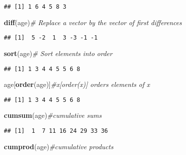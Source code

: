 \documentclass[]{book}
\newenvironment{Shaded}{\begin{snugshade}}{\end{snugshade}}
\newcommand{\KeywordTok}[1]{\textcolor[rgb]{0.13,0.29,0.53}{\textbf{#1}}}
\newcommand{\CommentTok}[1]{\textcolor[rgb]{0.56,0.35,0.01}{\textit{#1}}}
\newcommand{\NormalTok}[1]{#1}
\theoremstyle{definition}
\theoremstyle{definition}
\theoremstyle{definition}
\theoremstyle{remark}
\begin{document}
\begin{verbatim}
## [1] 1 6 4 5 8 3
\end{verbatim}

\begin{Shaded}
\begin{Highlighting}[]
\KeywordTok{diff}\NormalTok{(age)}\CommentTok{# Replace a vector by the vector of first differences}
\end{Highlighting}
\end{Shaded}

\begin{verbatim}
## [1]  5 -2  1  3 -3 -1 -1
\end{verbatim}

\begin{Shaded}
\begin{Highlighting}[]
\KeywordTok{sort}\NormalTok{(age)}\CommentTok{# Sort elements into order}
\end{Highlighting}
\end{Shaded}

\begin{verbatim}
## [1] 1 3 4 4 5 5 6 8
\end{verbatim}

\begin{Shaded}
\begin{Highlighting}[]
\NormalTok{age[}\KeywordTok{order}\NormalTok{(age)]}\CommentTok{#x[order(x)] orders elements of x}
\end{Highlighting}
\end{Shaded}

\begin{verbatim}
## [1] 1 3 4 4 5 5 6 8
\end{verbatim}

\begin{Shaded}
\begin{Highlighting}[]
\KeywordTok{cumsum}\NormalTok{(age)}\CommentTok{#cumulative sums}
\end{Highlighting}
\end{Shaded}

\begin{verbatim}
## [1]  1  7 11 16 24 29 33 36
\end{verbatim}

\begin{Shaded}
\begin{Highlighting}[]
\KeywordTok{cumprod}\NormalTok{(age)}\CommentTok{#cumulative products}
\end{Highlighting}
\end{Shaded}
\end{document}
